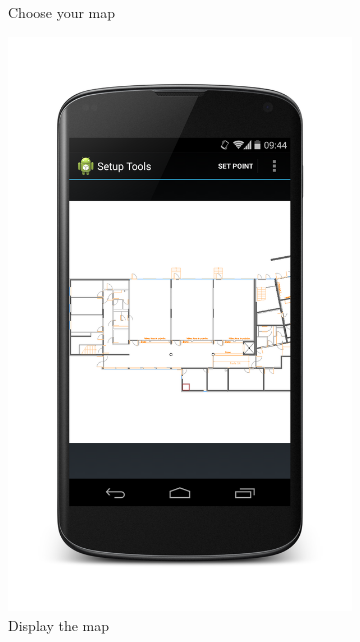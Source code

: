 \begin{figure}[h]
\begin{subfigure}[b]{0.3\textwidth}
                \caption{Choose your map}
                \label{fig:map_list}
        \end{subfigure}
        \begin{subfigure}[b]{0.3\textwidth}
                \includegraphics[scale=0.1]{./android/Setup_set.png}
                \caption{Display the map}
                \label{fig:map_set}
        \end{subfigure}
        \begin{subfigure}[b]{0.3\textwidth}

\end{subfigure}
\end{figure}
